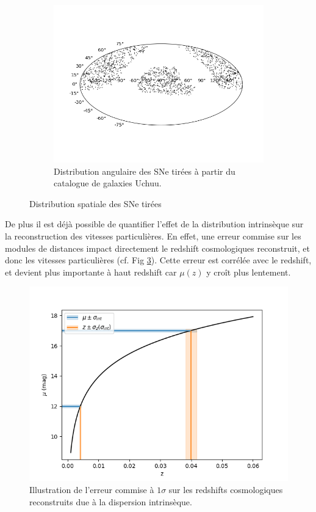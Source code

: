 \documentclass{book}
\begin{document}
\begin{figure}
\begin{subfigure}[c]{0.5\textwidth}
		\includegraphics[width=\textwidth, trim={1cm 2.5cm 1cm 2.5cm}, clip]{figures/angular_draw.png}
		\caption{Distribution angulaire des SNe tirées à partir du catalogue de galaxies Uchuu.}
		\label{fig:ang_draw}
	\end{subfigure}
	
	\caption{Distribution spatiale des SNe tirées}
\end{figure}

De plus il est déjà possible de quantifier l'effet de la distribution intrinsèque sur la reconstruction des vitesses particulières. En effet, une erreur commise sur les modules de distances impact directement le redshift cosmologiques reconstruit, et donc les vitesses particulières (cf. Fig \ref{fig:vp_sigma_int}). Cette erreur est corrélée avec le redshift, et devient plus importante à haut redshift car $\mu(z)$ y croît plus lentement.

\begin{figure}
	\centering
	\includegraphics[width=0.8\linewidth]{figures/sigma_int_effect_vp.png}
	\caption{Illustration de l'erreur commise à $1\sigma$ sur les redshifts cosmologiques reconstruits due à la dispersion intrinsèque.}
	\label{fig:vp_sigma_int}
\end{figure}
\end{document}
